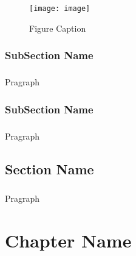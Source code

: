 \documentclass[14pt]{report}
\begin{document}
{\begin{figure}[ht]
\centering
\texttt{[image: image]}
\label{fig:image}
\caption{Figure Caption}
\end{figure}
\subsection{SubSection Name}
\paragraph{} Pragraph
\subsection{SubSection Name}
\paragraph{} Pragraph

\section{Section Name}
\paragraph{} Pragraph

\chapter{Chapter Name}
}
\end{document}
